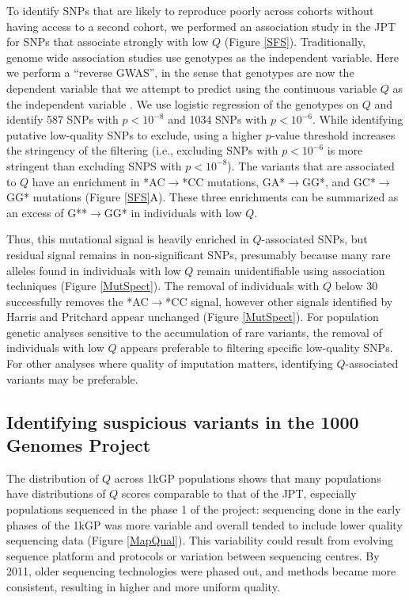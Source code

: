 \documentclass[9pt,lineno]{template}
\begin{document}
To identify SNPs that are likely to reproduce poorly across cohorts without having access to a second cohort, we performed an association study in the JPT for SNPs that associate strongly with low $Q$ (Figure \ref{SFS}).
Traditionally, genome wide association studies use genotypes as the independent variable. 
Here we perform a ``reverse GWAS'', in the sense that genotypes are now the dependent variable that we attempt to predict using the continuous variable $Q$ as the independent variable \citep{song2015testing}.
We use logistic regression of the genotypes on $Q$ and identify 587 SNPs with $p < 10^{-8}$ and 1034 SNPs with $ p < 10^{-6}$. 
While identifying putative low-quality SNPs to exclude, using a higher $p$-value threshold increases the stringency of the filtering (i.e., excluding SNPs with $ p < 10^{-6}$ is more stringent than excluding SNPS with $p < 10^{-8}$). 
The variants that are associated to $Q$ have an enrichment in *AC${\rightarrow}$*CC mutations, GA*${\rightarrow}$GG*, and GC*${\rightarrow}$GG* mutations (Figure \ref{SFS}A).
These three enrichments can be summarized as an excess of G**${\rightarrow}$GG* in individuals with low $Q$.

Thus, this mutational signal is heavily enriched in $Q$-associated SNPs, but residual signal remains in non-significant SNPs, presumably because many rare alleles found in individuals with low $Q$ remain unidentifiable using association techniques (Figure \ref{MutSpect}). The removal of individuals with $Q$ below 30 successfully removes the *AC${\rightarrow}$*CC signal, however other signals identified by Harris and Pritchard appear unchanged (Figure \ref{MutSpect}).
For population genetic analyses sensitive to the accumulation of rare variants, the removal of individuals with low $Q$ appears preferable to filtering specific low-quality SNPs. 
For other analyses where quality of imputation matters, identifying $Q$-associated variants may be preferable. 

\subsection{Identifying suspicious variants in the 1000 Genomes Project}
The distribution of $Q$ across 1kGP populations shows that many populations have distributions of $Q$ scores comparable to that of the JPT, especially populations sequenced in the phase 1 of the project: sequencing done in the early phases of the 1kGP was more variable and overall tended to include lower quality sequencing data (Figure \ref{MapQual}).
This variability could result from evolving sequence platform and protocols or variation between sequencing centres. 
By 2011, older sequencing technologies were phased out, and methods became more consistent, resulting in higher and more uniform quality.
\end{document}
